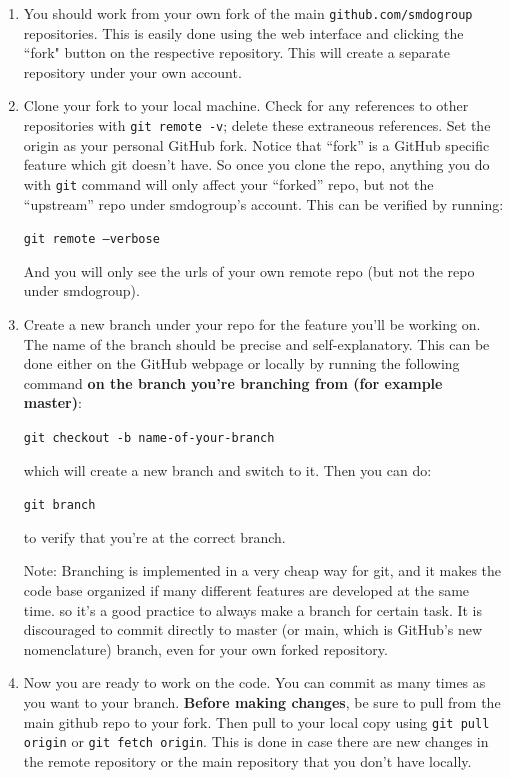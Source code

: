 \documentclass[11pt]{article}
\begin{document}
\begin{enumerate}
    \item You should work from your own fork of the main \verb|github.com/smdogroup| repositories. This is easily done using the web interface and clicking the ``fork" button on the respective repository. This will create a separate repository under your own account.
    \item Clone your fork to your local machine. Check for any references to other repositories with \verb|git remote -v|; delete these extraneous references. Set the origin as your personal GitHub fork. Notice that ``fork'' is a GitHub specific feature which git doesn't have.
    So once you clone the repo, anything you do with \texttt{git} command will only
    affect your ``forked'' repo, but not the ``upstream'' repo under smdogroup's account.
    This can be verified by running:

    \texttt{git remote --verbose}

    And you will only see the urls of your own remote repo (but not the repo under smdogroup).
    \item Create a new branch under your repo for the feature you'll be working on.
    The name of the branch should be precise and self-explanatory.
    This can be done either on the GitHub webpage or locally by running the
    following command \textbf{on the branch you're branching from (for example master)}:

    \texttt{git checkout -b name-of-your-branch}

    which will create a new branch and switch to it.
    Then you can do:

    \texttt{git branch}

    to verify that you're at the correct branch.

    Note:
    Branching is implemented in a very cheap way for git, and it makes the code base organized
    if many different features are developed at the same time.
    so it's a good practice to always make a branch for certain task. It is discouraged to commit directly to master (or main, which is GitHub's new nomenclature) branch, even for your own forked repository.
    
    \item Now you are ready to work on the code. You can commit as many times as you want to your branch. \textbf{Before making changes}, be sure to pull from the main github repo to your fork. Then pull to your local copy using \verb|git pull origin| or \verb|git fetch origin|. This is done in case there are new changes in the remote repository or the main repository that you don't have locally.
    

\end{enumerate}
\end{document}
